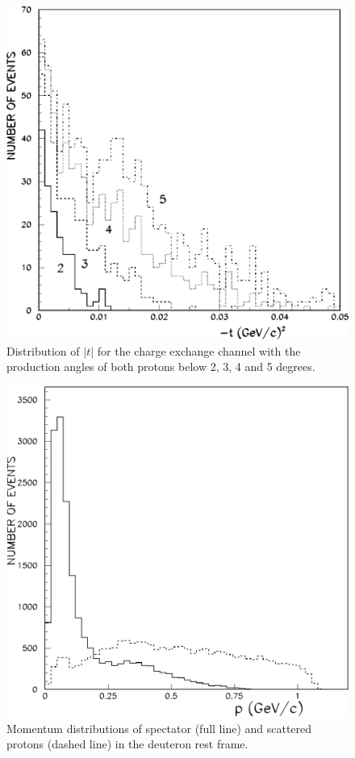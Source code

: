\documentclass[epj]{svjour}
\begin{document}
\begin{figure}
  \centering
  \includegraphics[width=0.88\columnwidth]{fig3.pdf}
  \caption{Distribution of $\vert t \vert$ for the charge exchange channel with
    the production angles of both protons below 2, 3, 4 and 5 degrees.}
\end{figure}
\begin{figure}
  \centering
  \includegraphics[width=0.88\columnwidth]{fig4.pdf}
  \caption{Momentum distributions of spectator (full line) and scattered protons
    (dashed line) in the deuteron rest frame.}
\end{figure}
\end{document}
